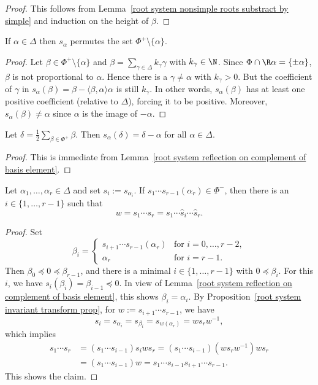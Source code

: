 \begin{proof}
This follows from Lemma~\ref{root system nonsimple roots substract by simple} and induction on the height of $\beta$.
\end{proof}
\begin{lemma}\label{root system reflection on complement of basis element}
If $\alpha\in\Delta$ then $s_\alpha$ permutes the set $\Phi^+\setminus\{\alpha\}$.
\end{lemma}
\begin{proof}
Let $\beta\in\Phi^+\setminus\{\alpha\}$ and $\beta=\sum_{\gamma\in\Delta}k_\gamma\gamma$ with $k_\gamma\in\N$. Since $\Phi\cap\R\alpha=\{\pm\alpha\}$, $\beta$ is not proportional to $\alpha$. Hence there is a $\gamma\neq\alpha$ with $k_\gamma>0$. But the coefficient of $\gamma$ in $s_\alpha(\beta)=\beta-\langle\beta,\alpha\rangle\alpha$ is still $k_\gamma$. In other words, $s_\alpha(\beta)$ has at least one positive coefficient (relative to $\Delta$), forcing it to be positive. Moreover, $s_\alpha(\beta)\neq\alpha$ since $\alpha$ is the image of $-\alpha$.
\end{proof}
\begin{corollary}\label{root system half sum of positive under reflection}
Let $\delta=\frac{1}{2}\sum_{\beta\in\Phi^+}\beta$. Then $s_\alpha(\delta)=\delta-\alpha$ for all $\alpha\in\Delta$.
\end{corollary}
\begin{proof}
This is immediate from Lemma~\ref{root system reflection on complement of basis element}.
\end{proof}
\begin{lemma}\label{root system iterated reflection}
Let $\alpha_1,\dots,\alpha_r\in\Delta$ and set $s_i:=s_{\alpha_i}$. If $s_1\cdots s_{r-1}(\alpha_r)\in\Phi^-$, then there is an $i\in\{1,\dots,r-1\}$ such that
\[w=s_1\cdots s_r=s_1\cdots\hat{s}_i\cdots\hat{s}_r.\]
\end{lemma}
\begin{proof}
Set
\[\beta_i=\begin{cases}
s_{i+1}\cdots s_{r-1}(\alpha_r)&\text{for }i=0,\dots,r-2,\\
\alpha_r&\text{for }i=r-1.
\end{cases}\]
Then $\beta_0\preceq 0\preceq\beta_{r-1}$, and there is a minimal $i\in\{1,\dots,r-1\}$ with $0\preceq\beta_i$. For this $i$, we have $s_i(\beta_i)=\beta_{i-1}\preceq 0$. In view of Lemma~\ref{root system reflection on complement of basis element}, this shows $\beta_i=\alpha_i$. By Proposition~\ref{root system invariant transform prop}, for $w:=s_{i+1}\cdots s_{r-1}$, we have
\[s_i=s_{\alpha_i}=s_{\beta_i}=s_{w(\alpha_r)}=ws_rw^{-1},\]
which implies
\begin{align*}
s_1\cdots s_r&=(s_1\cdots s_{i-1})s_iws_r=(s_1\cdots s_{i-1})(ws_rw^{-1})ws_r\\
&=(s_1\cdots s_{i-1})w=s_1\cdots s_{i-1}s_{i+1}\cdots s_{r-1}.
\end{align*}
This shows the claim.
\end{proof}
